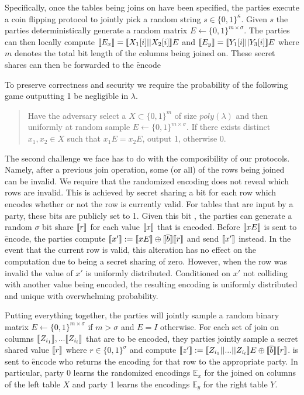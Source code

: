Specifically, once the tables being joins on have been specified, the parties execute a coin flipping protocol to jointly pick a random string $s\in \{0,1\}^\kappa$. Given $s$ the parties deterministically generate a random matrix $E\gets\{0,1\}^{m\times \sigma}$. The parties can then locally compute $\llbracket E_x\rrbracket=\llbracket X_1[i] || X_2[i]\rrbracket E$ and $\llbracket E_y\rrbracket=\llbracket Y_1[i] || Y_3[i]\rrbracket E$ where $m$ denotes the total bit length of the columns being joined on. These secret shares can then be forwarded to the \f{encode}

To preserve correctness and security we require the probability of the following game outputting 1 be negligible in $\lambda$. 
\begin{quote}
Have the adversary select a $X\subset \{0,1\}^{m}$ of size $poly(\lambda)$ and then uniformly at random sample $E\gets \{0,1\}^{m\times \sigma}$. If there exists distinct $x_1,x_2\in X$ such that $x_1E = x_2E$, output 1, otherwise 0. 
\end{quote}


The second challenge we face has to do with the composibility of our protocols. Namely, after a previous join operation, some (or all) of the rows being joined can be invalid. We require that the randomized encoding does not reveal which rows are invalid. This is achieved by secret sharing a bit for each row which encodes whether or not the row is currently valid. For tables that are input by a party, these bits are publicly set to 1. Given this bit , the parties can generate a random $\sigma$ bit share $\llbracket r\rrbracket$ for each value $\llbracket x\rrbracket$ that is encoded. Before $\llbracket xE\rrbracket$ is sent to \f{encode}, the parties compute $\llbracket x'\rrbracket:=\llbracket xE\rrbracket\oplus \llbracket \overline{b}\rrbracket\llbracket r\rrbracket$ and send $\llbracket x'\rrbracket$ instead. In the event that the current row is valid, this alteration has no effect on the computation due to  being a secret sharing of zero. However, when the row was invalid the value of $x'$ is uniformly distributed. Conditioned on $x'$ not colliding with another value being encoded, the resulting encoding is uniformly distributed and unique with overwhelming probability. 


Putting everything together, the parties will jointly sample a random binary matrix $E\gets\{0,1\}^{m\times \sigma}$ if $m>\sigma$ and $E=I$ otherwise. For each set of join on columns $\llbracket Z_{i_1}\rrbracket,...\llbracket Z_{i_l}\rrbracket$ that are to be encoded, they parties jointly sample a secret shared value $\llbracket r\rrbracket$ where $r\in\{0,1\}^\sigma$ and compute $\llbracket z'\rrbracket:=\llbracket Z_{i_1}||...||Z_{i_l}\rrbracket E \oplus \llbracket \overline{b}\rrbracket\llbracket r\rrbracket$.  is sent to \f{encode} who returns the encoding for that row to the appropriate party. In particular, party 0 learns the randomized encodings $\mathbb{E}_x$ for the joined on columns of the left table $X$ and party 1 learns the encodings $\mathbb{E}_y$ for the right table $Y$.

